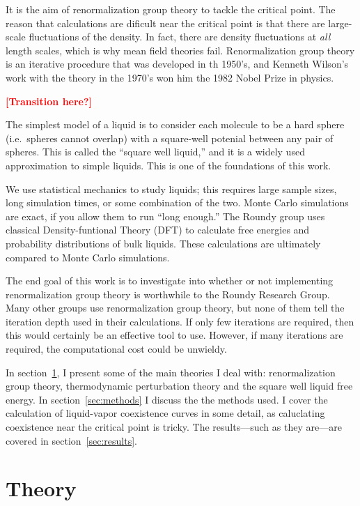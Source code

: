 \documentclass[letterpaper,twocolumn,amsmath,amssymb,prb]{revtex4-1}
\newcommand{\1}{\ensuremath{\textbf{r}_1}}
\newcommand{\2}{\ensuremath{\textbf{r}_2}}
\newcommand{\3}{\ensuremath{\textbf{r}_3}}
\newcommand{\4}{\ensuremath{\textbf{r}_4}}
\newcommand{\fixme}[1]{\textcolor{red}{\textbf{[#1]}}}
\begin{document}
It is the aim of renormalization group theory to tackle the critical
point. The reason that calculations are dificult near the critical
point is that there are large-scale fluctuations of the density. In
fact, there are density fluctuations at \emph{all} length
scales, which is why mean field theories fail. Renormalization group theory is an iterative procedure that
was developed in th 1950's, and Kenneth Wilson's work with the theory
in the 1970's won him the 1982 Nobel Prize in physics.\cite{Nobel82}

\fixme{Transition here?}

The simplest model of a liquid is to consider each molecule to be a
hard sphere (i.e.~spheres cannot overlap) with a square-well potenial
between any pair of spheres. This is called the ``square well
liquid,'' and it is a widely used approximation to simple
liquids. This is one of the foundations of this work.

We use statistical mechanics to study liquids; this requires large
sample sizes, long simulation times, or some combination of the
two. Monte Carlo simulations are exact, if you allow them to run
``long enough.'' The Roundy group uses classical Density-funtional
Theory (DFT) to calculate free energies and probability distributions
of bulk liquids. These calculations are ultimately compared to Monte Carlo simulations.

The end goal of this work is to investigate into whether or not
implementing renormalization group theory is worthwhile to the Roundy
Research Group. Many other groups use renormalization group theory,
but none of them tell the iteration depth used in their
calculations.\cite{Forte11,Ramana12,Ghobadi13,Wang13,Zhao13} If only
few iterations are required, then this would certainly be an effective
tool to use. However, if many iterations are required, the
computational cost could be unwieldy.

In section~\ref{sec:theory}, I present some of the main theories I
deal with: renormalization group theory, thermodynamic perturbation
theory and the square well liquid free energy. In
section~\ref{sec:methods} I discuss the the methods used. I cover the
calculation of liquid-vapor coexistence curves in some detail, as
caluclating coexistence near the critical point is tricky. The
results---such as they are---are covered in section~\ref{sec:results}.

\section{Theory}\label{sec:theory}
\end{document}
